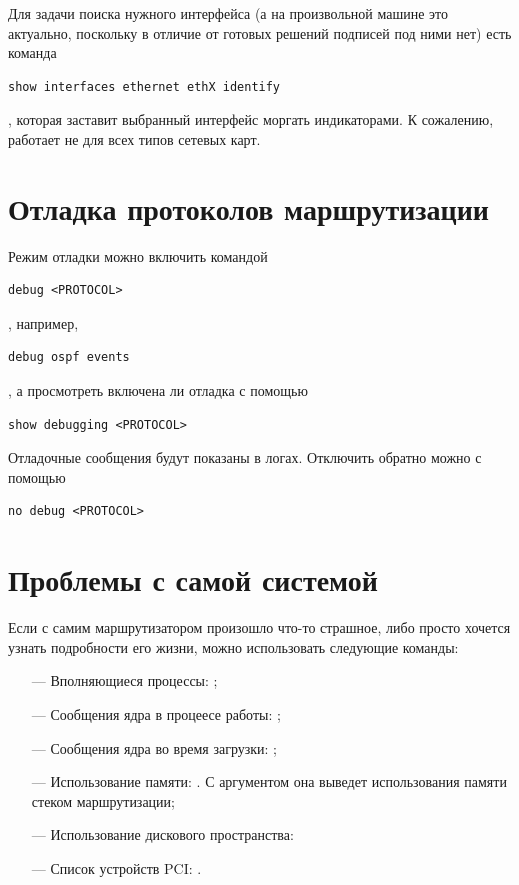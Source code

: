 \documentclass[a4paper,12pt, twoside, russian]{report}
\begin{document}
Для задачи поиска нужного интерфейса (а на произвольной машине это актуально, поскольку в отличие от
готовых решений подписей под ними нет) есть команда 
\begin{verbatim}show interfaces ethernet ethX identify\end{verbatim}, которая заставит выбранный интерфейс
моргать индикаторами. К сожалению, работает не для всех типов сетевых карт.

\section{Отладка протоколов маршрутизации}

Режим отладки можно включить командой \begin{verbatim}debug <PROTOCOL>\end{verbatim}, например, 
\begin{verbatim}debug ospf events\end{verbatim}, а просмотреть включена ли отладка с помощью 
\begin{verbatim}show debugging <PROTOCOL>\end{verbatim} Отладочные сообщения будут показаны в логах. 
Отключить обратно можно с помощью \begin{verbatim}no debug <PROTOCOL>\end{verbatim}

\section{Проблемы с самой системой}

Если с самим маршрутизатором произошло что-то страшное, либо просто хочется узнать подробности его жизни, 
можно использовать следующие команды:
\begin{itemize}
\item[---] Вполняющиеся процессы: ;
\item[---] Сообщения ядра в процеесе работы: ;
\item[---] Сообщения ядра во время загрузки: ;
\item[---] Использование памяти: . С аргументом 
она выведет использования памяти стеком маршрутизации;
\item[---] Использование дискового пространства: 
\item[---] Список устройств PCI: .
\end{itemize}
\end{document}
